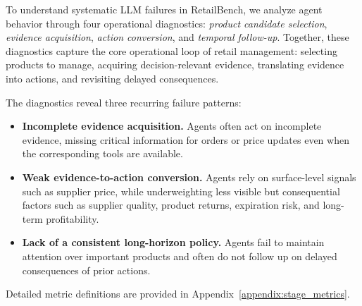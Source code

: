 \label{sec:failure_analysis}

To understand systematic LLM failures in RetailBench, we analyze agent behavior through four operational diagnostics: \textit{product candidate selection}, \textit{evidence acquisition}, \textit{action conversion}, and \textit{temporal follow-up}. Together, these diagnostics capture the core operational loop of retail management: selecting products to manage, acquiring decision-relevant evidence, translating evidence into actions, and revisiting delayed consequences.

The diagnostics reveal three recurring failure patterns:
\begin{itemize}[leftmargin=*]
    \item \textbf{Incomplete evidence acquisition.} Agents often act on incomplete evidence, missing critical information for orders or price updates even when the corresponding tools are available.
    \item \textbf{Weak evidence-to-action conversion.} Agents rely on surface-level signals such as supplier price, while underweighting less visible but consequential factors such as supplier quality, product returns, expiration risk, and long-term profitability.
    \item \textbf{Lack of a consistent long-horizon policy.} Agents fail to maintain attention over important products and often do not follow up on delayed consequences of prior actions.
\end{itemize}
Detailed metric definitions are provided in Appendix~\ref{appendix:stage_metrics}.

